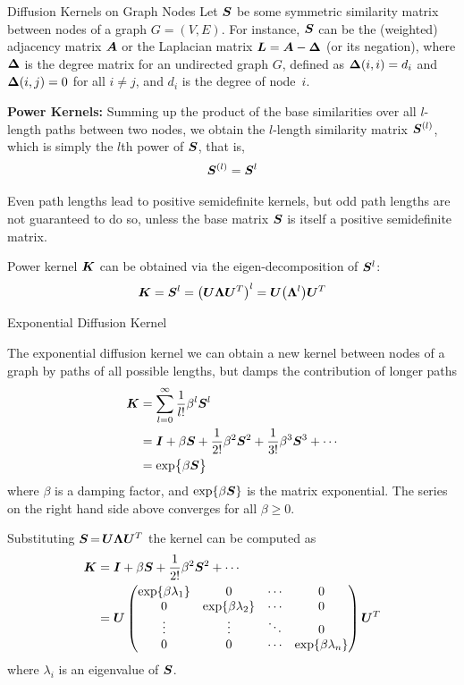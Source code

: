 \begin{frame}{Diffusion Kernels on Graph Nodes}
Let ${\boldsymbol S}$ be some symmetric similarity matrix between nodes of a graph
$G=(V,E)$.  For instance, ${\boldsymbol S}$
can be the (weighted) adjacency matrix ${\boldsymbol A}$ or
the Laplacian matrix ${\boldsymbol L} = {\boldsymbol A} - {\bm \Delta}$ (or its negation),
where ${\bm \Delta}$ is the degree matrix for
an undirected graph $G$, def\/{i}ned as ${\bm \Delta}(i,i) = d_i$ and
${\bm \Delta}(i,j) = 0$ for all $i\ne j$, and $d_i$ is the degree of node~$i$.


\medskip
{\bf Power Kernels:}
Summing up the
product of the base similarities over all $l$-length paths between two
nodes, we obtain the $l$-length similarity matrix ${\boldsymbol S}^{(l)}$,
which is simply the $l$th power of ${\boldsymbol S}$, that is,
\begin{align*}
  {\boldsymbol S}^{(l)} = {\boldsymbol S}^l
\end{align*}

\medskip
Even path lengths lead to positive semidef\/{i}nite kernels, but odd path
lengths are not guaranteed to do so, unless the base matrix ${\boldsymbol S}$ is
itself a positive semidef\/{i}nite matrix.

\medskip
Power kernel ${\boldsymbol K}$ can be obtained via the eigen-decomposition of ${\boldsymbol S}^l$:
\begin{align*}
  {\boldsymbol K} = {\boldsymbol S}^l = \bigl({\boldsymbol U} {\bm \Lambda} {\boldsymbol U}^T\bigr)^l
  = {\boldsymbol U} \bigl({\bm \Lambda}^l\bigr) {\boldsymbol U}^T
\end{align*}

\end{frame}


\begin{frame}{Exponential Diffusion Kernel}
\small

The exponential diffusion kernel 
we can obtain a new kernel between nodes of a graph by 
paths of all possible lengths, but damps the contribution of longer
paths
\begin{align*}
  {\boldsymbol K} & = \sum_{l=0}^\infty {1 \over l!} \beta^l {\boldsymbol S}^l\\
  & = {\boldsymbol I} + \beta {\boldsymbol S} + {1 \over 2!} \beta^2 {\boldsymbol S}^2 + {1 \over 3!}
  \beta^3 {\boldsymbol S}^3 + \cdots\\
  & = \exp\bigl\{ \beta {\boldsymbol S} \bigr\}
\end{align*}
where $\beta$ is a damping factor, and $\exp\{\beta{\boldsymbol S}\}$ is the
matrix exponential. The series on the right hand side above converges
for all $\beta \ge 0$.

%
\medskip
Substituting ${\boldsymbol S} \,{=}\, {\boldsymbol U} {\bm \Lambda} {\boldsymbol U}^T$ the kernel can be computed
as
\begin{align*}
  {\boldsymbol K}
  & = {\boldsymbol I} + \beta {\boldsymbol S} + {1 \over 2!} \beta^2 {\boldsymbol S}^2 + \cdots\\
  & = {\boldsymbol U}
  \begin{pmatrix} 
  \exp\{\beta\lambda_1\} & 0 & \cdots & 0\\
  0 & \exp\{\beta\lambda_2\} & \cdots & 0\\
  \vdots & \vdots & \ddots & 0\\
  0 & 0 & \cdots & \exp\{\beta\lambda_n\}
   \end{pmatrix} {\boldsymbol U}^T
\end{align*}
where $\lambda_i$ is an eigenvalue of ${\boldsymbol S}$.
\end{frame}



